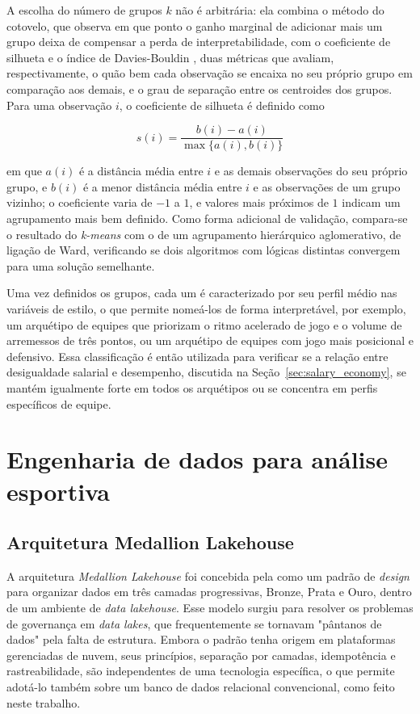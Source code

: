 A escolha do número de grupos $k$ não é arbitrária: ela combina o método do cotovelo, que observa em que ponto o ganho marginal de adicionar mais um grupo deixa de compensar a perda de interpretabilidade, com o coeficiente de silhueta \citep{rousseeuw1987} e o índice de Davies-Bouldin \citep{daviesbouldin1979}, duas métricas que avaliam, respectivamente, o quão bem cada observação se encaixa no seu próprio grupo em comparação aos demais, e o grau de separação entre os centroides dos grupos. Para uma observação $i$, o coeficiente de silhueta é definido como

\begin{equation}
s(i) = \frac{b(i) - a(i)}{\max\{a(i), b(i)\}}
\label{eq:silhueta}
\end{equation}

em que $a(i)$ é a distância média entre $i$ e as demais observações do seu próprio grupo, e $b(i)$ é a menor distância média entre $i$ e as observações de um grupo vizinho; o coeficiente varia de $-1$ a $1$, e valores mais próximos de $1$ indicam um agrupamento mais bem definido. Como forma adicional de validação, compara-se o resultado do \textit{k-means} com o de um agrupamento hierárquico aglomerativo, de ligação de Ward, verificando se dois algoritmos com lógicas distintas convergem para uma solução semelhante.

Uma vez definidos os grupos, cada um é caracterizado por seu perfil médio nas variáveis de estilo, o que permite nomeá-los de forma interpretável, por exemplo, um arquétipo de equipes que priorizam o ritmo acelerado de jogo e o volume de arremessos de três pontos, ou um arquétipo de equipes com jogo mais posicional e defensivo. Essa classificação é então utilizada para verificar se a relação entre desigualdade salarial e desempenho, discutida na Seção~\ref{sec:salary_economy}, se mantém igualmente forte em todos os arquétipos ou se concentra em perfis específicos de equipe.

\section{Engenharia de dados para análise esportiva}
\label{sec:data_engineering}

\subsection{Arquitetura Medallion Lakehouse}
\label{sec:medallion}

A arquitetura \textit{Medallion Lakehouse} foi concebida pela \citet{databricks_medallion} como um padrão de \textit{design} para organizar dados em três camadas progressivas, Bronze, Prata e Ouro, dentro de um ambiente de \textit{data lakehouse}. Esse modelo surgiu para resolver os problemas de governança em \textit{data lakes}, que frequentemente se tornavam "pântanos de dados" pela falta de estrutura. Embora o padrão tenha origem em plataformas gerenciadas de nuvem, seus princípios, separação por camadas, idempotência e rastreabilidade, são independentes de uma tecnologia específica, o que permite adotá-lo também sobre um banco de dados relacional convencional, como feito neste trabalho.

